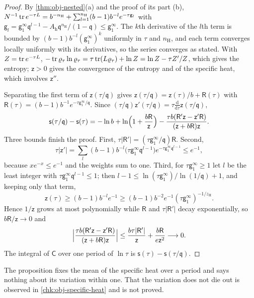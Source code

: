 \begin{proof}
By \cref{thm:obj-nested}(a) and the proof of its part (b), $N^{-1}\operatorname{tr} e^{-\tau L}=b^{-n_{\mathrm H}}+\sum_{l=1}^{n_{\mathrm H}}(b-1)b^{-l}e^{-\tau\mathsf g_l}$ with $\mathsf g_l=\mathsf g_1^\infty\mathfrak q^{l-1}-A_{\mathrm h}\mathfrak q^{n_{\mathrm H}}/(1-\mathfrak q)\le\mathsf g_1^\infty$. The $k$th derivative of the $l$th term is bounded by $(b-1)b^{-l}(\mathsf g_1^\infty)^k$ uniformly in $\tau$ and $n_{\mathrm H}$, and each term converges locally uniformly with its derivatives, so the series converges as stated. With $Z=\operatorname{tr} e^{-\tau L}$, $-\operatorname{tr}\varrho_\tau\ln\varrho_\tau=\tau\operatorname{tr}(L\varrho_\tau)+\ln Z=\ln Z-\tau Z'/Z$, which gives the entropy; $\mathsf z>0$ gives the convergence of the entropy and of the specific heat, which involves $\mathsf z''$.

Separating the first term of $\mathsf z(\tau/\mathfrak q)$ gives $\mathsf z(\tau/\mathfrak q)=\mathsf z(\tau)/b+\mathsf R(\tau)$ with $\mathsf R(\tau)=(b-1)b^{-1}e^{-\tau\mathsf g_1^\infty/\mathfrak q}$. Since $(\tau/\mathfrak q)\mathsf z'(\tau/\mathfrak q)=\tau\frac{\mathrm d}{\mathrm d\tau}\mathsf z(\tau/\mathfrak q)$,
\[
\mathsf s(\tau/\mathfrak q)-\mathsf s(\tau)=-\ln b+\ln\Bigl(1+\frac{b\mathsf R}{\mathsf z}\Bigr)-\frac{\tau b(\mathsf R'\mathsf z-\mathsf z'\mathsf R)}{(\mathsf z+b\mathsf R)\mathsf z}.
\]
Three bounds finish the proof. First, $\tau\lvert\mathsf R'\rvert=(\tau\mathsf g_1^\infty/\mathfrak q)\mathsf R$. Second,
\[
\tau\lvert\mathsf z'\rvert=\sum_l(b-1)b^{-l}\bigl(\tau\mathsf g_1^\infty\mathfrak q^{l-1}\bigr)e^{-\tau\mathsf g_1^\infty\mathfrak q^{l-1}}\le e^{-1},
\]
because $xe^{-x}\le e^{-1}$ and the weights sum to one. Third, for $\tau\mathsf g_1^\infty\ge1$ let $l$ be the least integer with $\tau\mathsf g_1^\infty\mathfrak q^{l-1}\le1$; then $l-1\le\ln(\tau\mathsf g_1^\infty)/\ln(1/\mathfrak q)+1$, and keeping only that term,
\[
\mathsf z(\tau)\ge(b-1)b^{-l}e^{-1}\ge(b-1)b^{-2}e^{-1}(\tau\mathsf g_1^\infty)^{-1/z_{\mathrm H}}.
\]
Hence $1/\mathsf z$ grows at most polynomially while $\mathsf R$ and $\tau\lvert\mathsf R'\rvert$ decay exponentially, so $b\mathsf R/\mathsf z\to0$ and
\[
\Bigl\lvert\frac{\tau b(\mathsf R'\mathsf z-\mathsf z'\mathsf R)}{(\mathsf z+b\mathsf R)\mathsf z}\Bigr\rvert\le\frac{b\tau\lvert\mathsf R'\rvert}{\mathsf z}+\frac{b\mathsf R}{e\mathsf z^2}\longrightarrow0.
\]
The integral of $\mathsf C$ over one period of $\ln\tau$ is $\mathsf s(\tau)-\mathsf s(\tau/\mathfrak q)$.
\end{proof}

The proposition fixes the mean of the specific heat over a period and says nothing about its variation within one. That the variation does not die out is observed in \cref{chk:obj-specific-heat} and is not proved.

